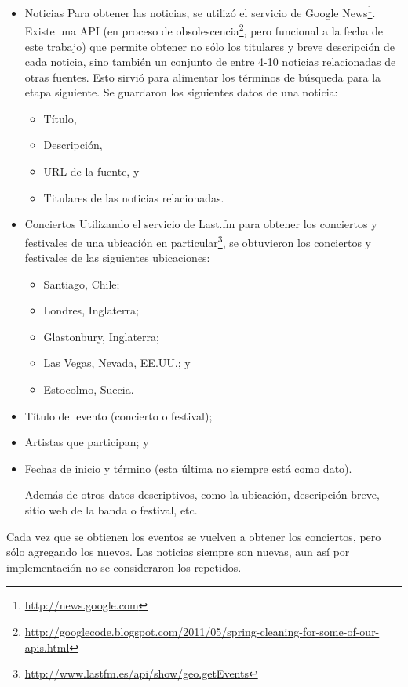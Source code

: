 \documentclass[upright, contnum]{umemoria}
\begin{document}
\begin{itemize}
\item Noticias
  Para obtener las noticias, se utilizó el servicio de Google
  News\footnote{\href{http://news.google.com}{http://news.google.com} }. Existe una API (en proceso de
  obsolescencia\footnote{\href{http://googlecode.blogspot.com/2011/05/spring-cleaning-for-some-of-our-apis.html}{http://googlecode.blogspot.com/2011/05/spring-cleaning-for-some-of-our-apis.html} }, 
  pero funcional a la fecha de este trabajo) que permite
  obtener no sólo los titulares y breve descripción de cada noticia,
  sino también un conjunto de entre 4-10 noticias relacionadas de otras
  fuentes. Esto sirvió para alimentar los términos de búsqueda para la
  etapa siguiente. Se guardaron los siguientes datos de una noticia:

\begin{itemize}
\item Título,
\item Descripción,
\item URL de la fuente, y
\item Titulares de las noticias relacionadas.
\end{itemize}

\item Conciertos
  Utilizando el servicio de Last.fm para obtener los conciertos y
  festivales de una ubicación en
  particular\footnote{\href{http://www.lastfm.es/api/show/geo.getEvents}{http://www.lastfm.es/api/show/geo.getEvents} }, se
  obtuvieron los conciertos y festivales de las siguientes
  ubicaciones:

\begin{itemize}
\item Santiago, Chile;
\item Londres, Inglaterra;
\item Glastonbury, Inglaterra;
\item Las Vegas, Nevada, EE.UU.; y
\item Estocolmo, Suecia.
\end{itemize}

\item Título del evento (concierto o festival);
\item Artistas que participan; y
\item Fechas de inicio y término (esta última no siempre está como
    dato).

  Además de otros datos descriptivos, como la ubicación, descripción
  breve, sitio web de la banda o festival, etc.
\end{itemize}
Cada vez que se obtienen los eventos se vuelven a obtener los
conciertos, pero sólo agregando los nuevos. Las noticias siempre son
nuevas, aun así por implementación no se consideraron los repetidos.
  
\end{document}
